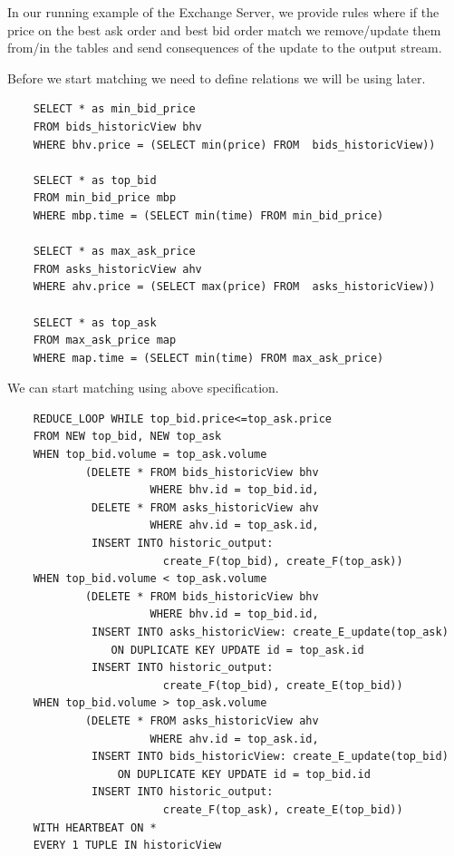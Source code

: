 \documentclass{article}
\begin{document}
In our running example of the Exchange Server, we provide rules where if the price on the best ask order and best bid order match we remove/update them from/in the tables and send consequences of the update to the output stream.

Before we start matching we need to define relations we will be using later.

\begin{verbatim}      
    SELECT * as min_bid_price
    FROM bids_historicView bhv
    WHERE bhv.price = (SELECT min(price) FROM  bids_historicView))
    
    SELECT * as top_bid
    FROM min_bid_price mbp
    WHERE mbp.time = (SELECT min(time) FROM min_bid_price)
    
    SELECT * as max_ask_price
    FROM asks_historicView ahv
    WHERE ahv.price = (SELECT max(price) FROM  asks_historicView))
    
    SELECT * as top_ask
    FROM max_ask_price map
    WHERE map.time = (SELECT min(time) FROM max_ask_price)
\end{verbatim}

We can start matching using above specification.

\begin{verbatim}  
    REDUCE_LOOP WHILE top_bid.price<=top_ask.price
    FROM NEW top_bid, NEW top_ask
    WHEN top_bid.volume = top_ask.volume 
            (DELETE * FROM bids_historicView bhv 
                      WHERE bhv.id = top_bid.id,
             DELETE * FROM asks_historicView ahv 
                      WHERE ahv.id = top_ask.id,
             INSERT INTO historic_output: 
                        create_F(top_bid), create_F(top_ask))
    WHEN top_bid.volume < top_ask.volume 
            (DELETE * FROM bids_historicView bhv 
                      WHERE bhv.id = top_bid.id,
             INSERT INTO asks_historicView: create_E_update(top_ask) 
                ON DUPLICATE KEY UPDATE id = top_ask.id
             INSERT INTO historic_output:
                        create_F(top_bid), create_E(top_bid))
    WHEN top_bid.volume > top_ask.volume 
            (DELETE * FROM asks_historicView ahv 
                      WHERE ahv.id = top_ask.id,
             INSERT INTO bids_historicView: create_E_update(top_bid) 
                 ON DUPLICATE KEY UPDATE id = top_bid.id
             INSERT INTO historic_output:
                        create_F(top_ask), create_E(top_bid))
    WITH HEARTBEAT ON *
    EVERY 1 TUPLE IN historicView
\end{verbatim}
\end{document}

